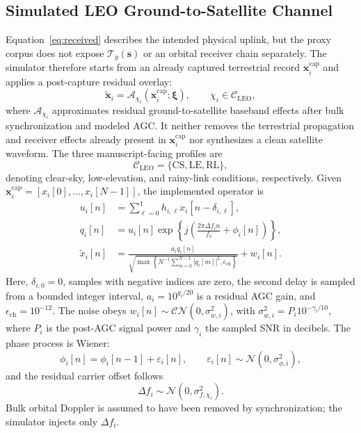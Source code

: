 \documentclass[journal]{IEEEtran}
\begin{document}
\subsection{Simulated LEO Ground-to-Satellite Channel}

Equation~\eqref{eq:received} describes the intended physical uplink, but the proxy corpus does not expose \(\mathcal{T}_{y}(\mathbf{s})\) or an orbital receiver chain separately. The simulator therefore starts from an already captured terrestrial record \(\mathbf{x}^{\mathrm{cap}}_i\) and applies a post-capture residual overlay:
\begin{equation}
\widetilde{\mathbf{x}}_i=
\mathcal{A}_{\chi_i}\!\left(
\mathbf{x}^{\mathrm{cap}}_i;\boldsymbol{\xi}
\right),
\qquad \chi_i\in\mathcal{C}_{\mathrm{LEO}},
\label{eq:fixed_observation}
\end{equation}
where \(\mathcal{A}_{\chi_i}\) approximates residual ground-to-satellite baseband effects after bulk synchronization and modeled AGC. It neither removes the terrestrial propagation and receiver effects already present in \(\mathbf{x}^{\mathrm{cap}}_i\) nor synthesizes a clean satellite waveform. The three manuscript-facing profiles are
\begin{equation}
\mathcal{C}_{\mathrm{LEO}}
=\{\mathrm{CS},\mathrm{LE},\mathrm{RL}\},
\end{equation}
denoting clear-sky, low-elevation, and rainy-link conditions, respectively. Given \(\mathbf{x}^{\mathrm{cap}}_{i}=[x_i[0],\ldots,x_i[N-1]]\), the implemented operator is
\begin{align}
u_i[n]&=\sum_{\ell=0}^{1}h_{i,\ell}
x_i[n-\delta_{i,\ell}],\label{eq:leo_multipath}\\
q_i[n]&=u_i[n]\exp\!\left\{j\!\left(
\frac{2\pi\Delta f_i n}{f_{\mathrm{s}}}+\phi_i[n]\right)\right\},\\
\widetilde{x}_i[n]&=
\frac{a_i q_i[n]}
{\sqrt{\max\!\left\{N^{-1}\sum_{m=0}^{N-1}|q_i[m]|^2,\epsilon_{\mathrm{ch}}\right\}}}
+w_i[n].
\label{eq:leo_channel}
\end{align}
Here, \(\delta_{i,0}=0\), samples with negative indices are zero, the second delay is sampled from a bounded integer interval, \(a_i=10^{g_i/20}\) is a residual AGC gain, and \(\epsilon_{\mathrm{ch}}=10^{-12}\). The noise obeys \(w_i[n]\sim\mathcal{CN}(0,\sigma_{w,i}^2)\), with \(\sigma_{w,i}^{2}=P_i10^{-\gamma_i/10}\), where \(P_i\) is the post-AGC signal power and \(\gamma_i\) the sampled SNR in decibels. The phase process is Wiener:
\begin{equation}
\phi_i[n]=\phi_i[n-1]+\varepsilon_i[n],\qquad
\varepsilon_i[n]\sim\mathcal{N}(0,\sigma_{\phi,i}^{2}),
\end{equation}
and the residual carrier offset follows
\begin{equation}
\Delta f_i\sim\mathcal{N}(0,\sigma_{f,\chi_i}^{2}).
\end{equation}
Bulk orbital Doppler is assumed to have been removed by synchronization; the simulator injects only \(\Delta f_i\).
\end{document}
